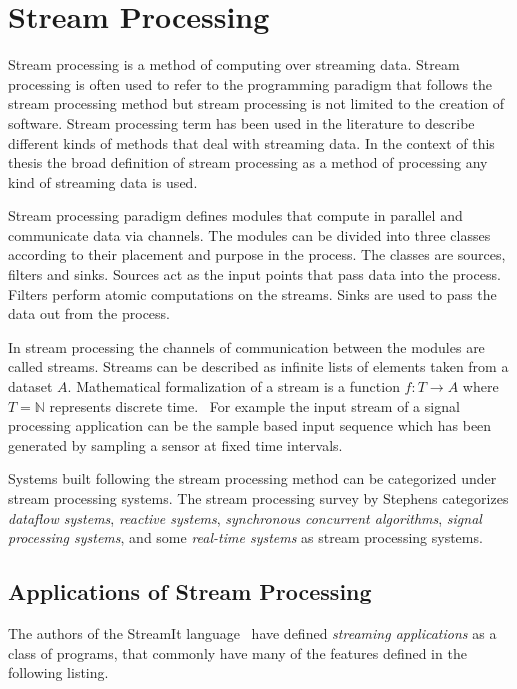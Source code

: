 \section{Stream Processing}
\label{sec:stream-processing}
Stream processing is a method of computing over streaming data. Stream processing is often used to refer to the programming paradigm that follows the stream processing method but stream processing is not limited to the creation of software. Stream processing term has been used in the literature to describe different kinds of methods that deal with streaming data. In the context of this thesis the broad definition of stream processing as a method of processing any kind of streaming data is used. 

Stream processing paradigm defines modules that compute in parallel and communicate data via channels. The modules can be divided into three classes according to their placement and purpose in the process. The classes are sources, filters and sinks. Sources act as the input points that pass data into the process. Filters perform atomic computations on the streams. Sinks are used to pass the data out from the process.~\cite{stephens1997survey}

In stream processing the channels of communication between the modules are called streams. Streams can be described as infinite lists of elements taken from a dataset $A$. Mathematical formalization of a stream is a function $f:T \rightarrow A$ where $T = \mathbb{N}$ represents discrete time.~\cite{stephens1997survey} For example the input stream of a signal processing application can be the sample based input sequence which has been generated by sampling a sensor at fixed time intervals.

Systems built following the stream processing method can be categorized under stream processing systems. The stream processing survey by Stephens \cite{stephens1997survey} categorizes \textit{dataflow systems}, \textit{reactive systems}, \textit{synchronous concurrent algorithms}, \textit{signal processing systems}, and some \textit{real-time systems} as stream processing systems. 

\subsection{Applications of Stream Processing}
\label{subsec:streaming-applications}
The authors of the StreamIt language~\cite{thies2002streamit} have defined \textit{streaming applications} as a class of programs, that commonly have many of the features defined in the following listing.

